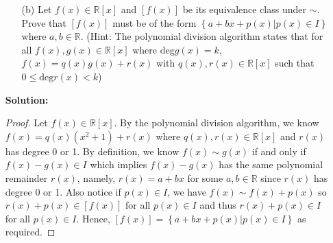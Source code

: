 \documentclass[letterpaper,12pt]{article}
\newcommand{\set}[1]{\left\{ #1 \right\}}
\theoremstyle{definition}
\begin{document}
\begin{enumerate}
    \item[] \begin{enumerate}
        \item[(b)] Let $f(x) \in \mathbb{R}[x]$ and $[f(x)]$ be its equivalence class under $\sim$. Prove that $[f(x)]$ must be of the form $\set{a + bx + p(x) | p(x) \in I}$ where $a,b \in \mathbb{R}$. (Hint: The polynomial division algorithm states that for all $f(x),g(x) \in \mathbb{R}[x]$ where $\mathrm{deg}g(x) = k$, $f(x)=q(x)g(x)+r(x)$ with $q(x),r(x) \in \mathbb{R}[x]$ such that $0 \leq \mathrm{deg}r(x) < k$)
    \end{enumerate}
    \begin{mdframed}
            \textbf{Solution:}
            \begin{proof}
                Let $f(x) \in \mathbb{R}[x]$. By the polynomial division algorithm, we know $f(x) = q(x)(x^2+1) + r(x)$ where $q(x), r(x)\in \mathbb{R}[x]$ and $r(x)$ has degree 0 or 1. By definition, we know $f(x) \sim g(x)$ if and only if $f(x) - g(x) \in I$ which implies $f(x)-g(x)$ has the same polynomial remainder $r(x)$, namely, $r(x) = a+bx$ for some $a,b \in \mathbb{R}$ since $r(x)$ has degree 0 or 1. Also notice if $p(x) \in I$, we have $f(x) \sim f(x) + p(x)$ so $r(x) + p(x) \in [f(x)]$ for all $p(x) \in I$ and thus $r(x) + p(x) \in I$ for all $p(x) \in I$. Hence, $[f(x)] = \set{a + bx + p(x) | p(x) \in I}$ as required.
            \end{proof}
        \end{mdframed}
\end{enumerate}
\pagebreak
\end{document}
